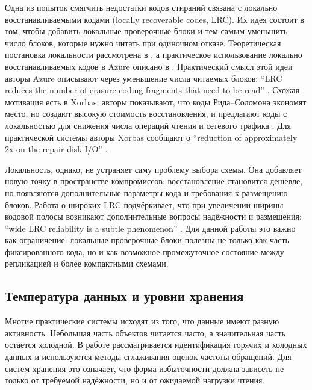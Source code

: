 Одна из попыток смягчить недостатки кодов стираний связана с локально
восстанавливаемыми кодами (locally recoverable codes, LRC). Их идея состоит
в том, чтобы добавить локальные проверочные блоки и тем самым уменьшить число
блоков, которые нужно читать при одиночном отказе. Теоретическая постановка
локальности рассмотрена в \cite{gopalan2012lrc}, а практическое использование
локально восстанавливаемых кодов в Azure описано в \cite{huang2012azure}.
Практический смысл этой идеи авторы Azure описывают через уменьшение числа
читаемых блоков: \enquote{LRC reduces the number of erasure coding fragments
that need to be read} \cite{huang2012azure}. Схожая мотивация есть в Xorbas:
авторы показывают, что коды Рида--Соломона
экономят место, но создают высокую стоимость восстановления, и предлагают коды
с локальностью для снижения числа операций чтения и сетевого трафика
\cite{sathiamoorthy2013xoring}. Для практической системы авторы Xorbas
сообщают о \enquote{reduction of approximately 2x on the repair disk I/O}
\cite{sathiamoorthy2013xoring}.

Локальность, однако, не устраняет саму проблему выбора схемы. Она добавляет
новую точку в пространстве компромиссов: восстановление становится дешевле, но
появляются дополнительные параметры кода и требования к размещению блоков.
Работа о широких LRC подчёркивает, что при увеличении ширины кодовой полосы
возникают дополнительные вопросы надёжности и размещения: \enquote{wide LRC
reliability is a subtle phenomenon} \cite{kadekodi2023widelrc}.
Для данной работы это важно как ограничение: локальные проверочные блоки
полезны не только как часть фиксированного кода, но и как возможное
промежуточное состояние между репликацией и более компактными схемами.

\subsection*{Температура данных и уровни хранения}

Многие практические системы исходят из того, что данные имеют разную
активность. Небольшая часть объектов читается часто, а значительная часть
остаётся холодной. В работе \cite{levandoski2013hotcold} рассматривается
идентификация горячих и холодных данных и используются методы сглаживания
оценок частоты обращений. Для систем хранения это означает, что форма
избыточности должна зависеть не только от требуемой надёжности, но и от
ожидаемой нагрузки чтения.

